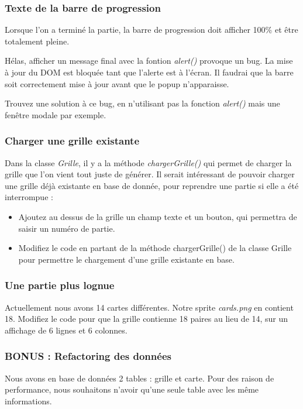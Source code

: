 \documentclass[a4paper,french,12pt]{article}
\begin{document}
\subsubsection{Texte de la barre de progression}
Lorsque l'on a terminé la partie, la barre de progression doit afficher 100\% et être totalement pleine.

Hélas, afficher un message final avec la fontion \textit{alert()} provoque un bug. La mise à jour du DOM est bloquée tant que l'alerte est à l'écran. Il faudrai que la barre soit correctement mise à jour avant que le popup n'apparaisse.

Trouvez une solution à ce bug, en n'utilisant pas la fonction \textit{alert()} mais une fenêtre modale par exemple.

\subsubsection{Charger une grille existante}
Dans la classe \textit{Grille}, il y a la méthode \textit{chargerGrille()} qui permet de charger la grille que l'on vient tout juste de générer.
Il serait intéressant de pouvoir charger une grille déjà existante en base de donnée, pour reprendre une partie si elle a été interrompue : 
\begin{itemize}
	\item Ajoutez au dessus de la grille un champ texte et un bouton, qui permettra de saisir un numéro de partie.
	\item Modifiez le code en partant de la méthode chargerGrille() de la classe Grille pour permettre le chargement d'une grille existante en base.
\end{itemize}

\subsubsection{Une partie plus lognue}
Actuellement nous avons 14 cartes différentes. Notre sprite \textit{cards.png} en contient 18.
Modifiez le code pour que la grille contienne 18 paires au lieu de 14, sur un affichage de 6 lignes et 6 colonnes.

\subsubsection{BONUS : Refactoring des données}
Nous avons en base de données 2 tables : grille et carte. Pour des raison de performance, nous souhaitons n'avoir qu'une seule table avec les même informations.
\end{document}
